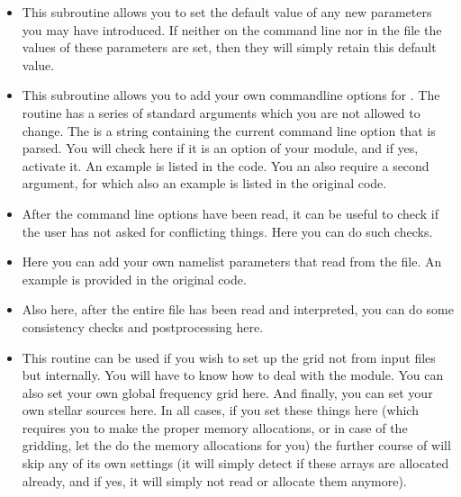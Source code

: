 \documentclass[letterpaper,10pt,english]{sphinxmanual}
\begin{document}
\begin{itemize}
\item {} 

This subroutine allows you to set the default value of any new parameters you
may have introduced. If neither on the command line nor in the 
file the values of these parameters are set, then they will simply retain this
default value.

\item {} 

This subroutine allows you to add your own command\sphinxhyphen{}line options for
. The routine has a series of standard arguments which you are
not allowed to change. The  is a string containing the current
command line option that is parsed. You will check here if it is an option of
your module, and if yes, activate it.  An example is listed in the code. You
an also require a second argument, for which also an example is listed in the
original code.

\item {} 

After the command line options have been read, it can be useful to check if
the user has not asked for conflicting things. Here you can do such checks.

\item {} 

Here you can add your own namelist parameters that read from the
 file. An example is provided in the original code.

\item {} 

Also here, after the entire  file has been read and
interpreted, you can do some consistency checks and postprocessing here.

\item {} 

This routine can be used if you wish to set up the grid not from input files
but internally. You will have to know how to deal with the 
module. You can also set your own global frequency grid here. And finally, you
can set your own stellar sources here. In all cases, if you set these things
here (which requires you to make the proper memory allocations, or in case of
the gridding, let the  do the memory allocations for you)
the further course of  will skip any of its own settings (it will
simply detect if these arrays are allocated already, and if yes, it will
simply not read or allocate them anymore).


\end{itemize}
\end{document}
